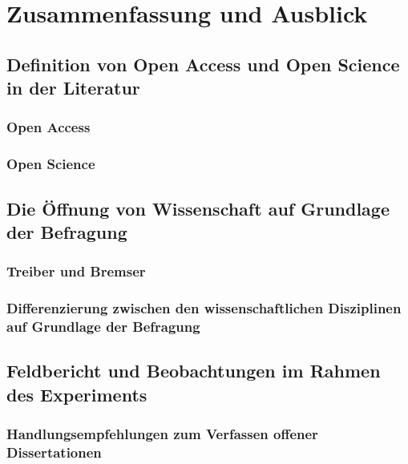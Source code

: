 \chapter{Zusammenfassung und Ausblick}

\section{Definition von Open Access und Open Science in der Literatur}
\subsection{Open Access}
\subsection{Open Science}
\section{Die Öffnung von Wissenschaft auf Grundlage der Befragung}
\subsection{Treiber und Bremser}
\subsection{Differenzierung zwischen den wissenschaftlichen Disziplinen auf Grundlage der Befragung}
\section{Feldbericht und Beobachtungen im Rahmen des Experiments}
\subsection{Handlungsempfehlungen zum Verfassen offener Dissertationen}
